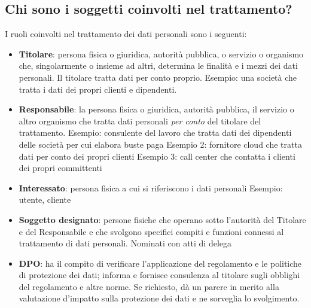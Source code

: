\subsection{Chi sono i soggetti coinvolti nel trattamento?}
I ruoli coinvolti nel trattamento dei dati personali sono i seguenti:
\begin{itemize}
    \item \textbf{Titolare}: persona fisica o giuridica, autorità pubblica, o servizio o organismo che, singolarmente o insieme ad altri, determina le finalità e i mezzi dei dati personali.
    Il titolare tratta dati per conto proprio.
    \newline
    Esempio: una società che tratta i dati dei propri clienti e dipendenti.

    \item \textbf{Responsabile}: la persona fisica o giuridica, autorità pubblica, il servizio o altro organismo che tratta dati personali \textit{per conto} del titolare del trattamento.
    \newline
    Esempio: consulente del lavoro che tratta dati dei dipendenti delle società per cui elabora buste paga
    \newline
    Esempio 2: fornitore cloud che tratta dati per conto dei propri clienti
    \newline
    Esempio 3: call center che contatta i clienti dei propri committenti

    \item \textbf{Interessato}: persona fisica a cui si riferiscono i dati personali
    Esempio: utente, cliente

    \item \textbf{Soggetto designato}: persone fisiche che operano sotto l'autorità del Titolare e del Responsabile e che svolgono specifici compiti e funzioni connessi al trattamento di dati personali. Nominati con atti di delega

    \item \textbf{DPO}: ha il compito di verificare l'applicazione del regolamento e le politiche di protezione dei dati; informa e fornisce consulenza al titolare sugli obblighi del regolamento e altre norme.
    Se richiesto, dà un parere in merito alla valutazione d'impatto sulla protezione dei dati e ne sorveglia lo svolgimento.
\end{itemize}

